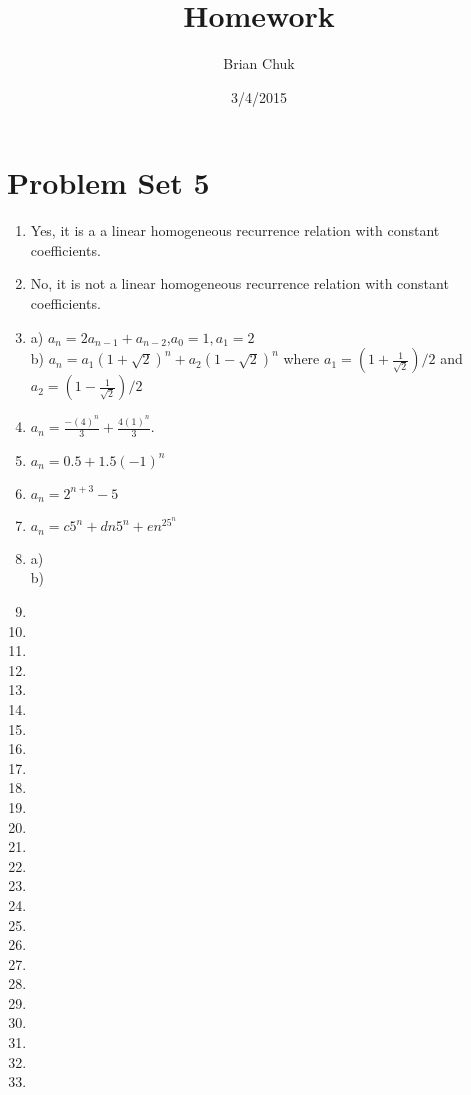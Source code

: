 \documentclass[11pt]{article}
\title{\textbf{Homework}}
\author{Brian Chuk}
\date{3/4/2015}
\begin{document}
\maketitle

\section{Problem Set 5}
\begin{enumerate}
\item Yes, it is a a linear homogeneous recurrence relation with constant coefficients.
\item No, it is not a linear homogeneous recurrence relation with constant coefficients.
\item a) $a_n=2a_{n-1} + a_{n-2}$,$a_0=1,a_1=2$
	\\b) $a_n=a_1(1+\sqrt{2})^n + a_2(1-\sqrt{2})^n$ where $a_1=(1+\frac{1}{\sqrt{2}})/2$ and $a_2=(1-\frac{1}{\sqrt{2}})/2$
\item $a_n = \frac{-(4)^n}{3} + \frac{4(1)^n}{3}$.	
\item $a_n = 0.5 + 1.5(-1)^n$
\item $a_n= 2^{n+3} - 5$
\item $a_n=c5^n+dn5^n+en^25^n$
\item a) 
	\\b) 
\item
\item
\item
\item
\item
\item
\item
\item
\item
\item
\item
\item
\item
\item
\item
\item
\item
\item
\item
\item
\item
\item
\item
\item
\item
\end{enumerate}
\end{document}

